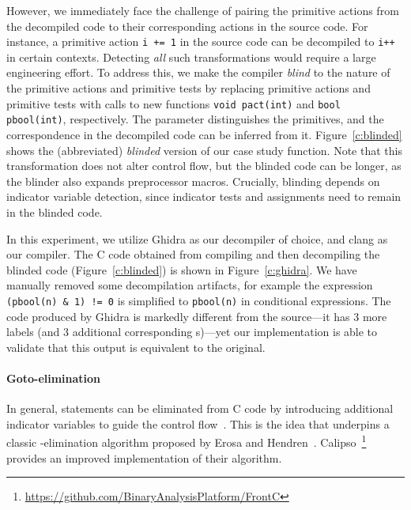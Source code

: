 However, we immediately face the challenge of pairing the primitive actions from the decompiled code to their corresponding actions in the source code. 
For instance, a primitive action \lstinline{i += 1} in the source code can be decompiled to \lstinline{i++} in certain contexts.
Detecting \emph{all} such transformations would require a large engineering effort. 
To address this, we make the compiler \emph{blind} to the nature of the primitive actions and primitive tests by replacing primitive actions and primitive tests with calls to new functions \lstinline{void pact(int)} and \lstinline{bool pbool(int)}, respectively. The parameter distinguishes the primitives, and the correspondence in the decompiled code can be inferred from it. Figure~\ref{c:blinded} shows the (abbreviated) \emph{blinded} version of our case study function. Note that this transformation does not alter control flow, but the blinded code can be longer, as the blinder also expands preprocessor macros.
Crucially, blinding depends on indicator variable detection, since indicator tests and assignments need to remain in the blinded code.

In this experiment, we utilize Ghidra as our decompiler of choice, and clang as our compiler.
The C code obtained from compiling and then decompiling the blinded code (Figure~\ref{c:blinded}) is shown in Figure~\ref{c:ghidra}. 
We have manually removed some decompilation artifacts, for example the expression \lstinline{(pbool(n) & 1) != 0} is simplified to \lstinline{pbool(n)} in conditional expressions.
The code produced by Ghidra is markedly different from the source---it has 3 more labels (and 3 additional corresponding s)---yet our implementation is able to validate that this output is equivalent to the original.

\paragraph{Goto-elimination}
In general,  statements can be eliminated from C code by introducing additional indicator variables to guide the control flow~\cite{yakdan_NoMoreGotos_2015,DBLP:journals/cacm/BohmJ66,erosa-hendren-1994}.
This is the idea that underpins a classic -elimination algorithm proposed by Erosa and Hendren~\cite{erosa-hendren-1994}.
Calipso~\cite{casse_ApprochePourReduire_2002}\footnote{\url{https://github.com/BinaryAnalysisPlatform/FrontC}} provides an improved implementation of their algorithm.

